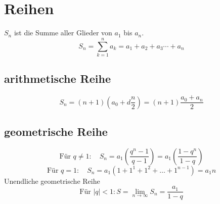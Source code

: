 \section{Reihen}
$S_n$ ist die Summe aller Glieder von $a_1$ bis $a_n$. 
\[ \boxed{S_n = \sum_{k=1}^{n} a_k = a_1 + a_2 + a_3 \cdots + a_n} \]

\subsection{arithmetische Reihe}
\[ \boxed{S_n = (n + 1)(a_0 + d \frac{n}{2}) = (n + 1) \frac{a_0 + a_n}{2}} \]

\subsection{geometrische Reihe}
\[ \boxed{\text{Für } q \neq 1: \quad S_n = a_1 (  \frac{q^n - 1}{q - 1} ) = a_1 (  \frac{1 - q^n}{1 - q} )} \]
\[ \boxed{\text{Für } q = 1: \quad S_n = a_1 (1+1^1 + 1^2 + \ldots + 1^{n-1}) = a_1 n} \]
Unendliche geometrische Reihe
\[ \boxed{\text{Für } |q| < 1: S = \lim_{n \rightarrow \infty} S_n = \frac{a_1}{1 - q}} \]